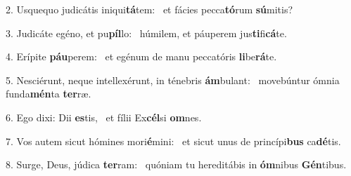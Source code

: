 2. Usquequo judicátis iniqui\textbf{tá}tem: \ast\  et fácies pecca\textbf{tó}rum \textbf{sú}mitis?\

3. Judicáte egéno, et pu\textbf{píl}lo: \ast\  húmilem, et páuperem jus\textbf{ti}fi\textbf{cá}te.\

4. Erípite \textbf{páu}perem: \ast\  et egénum de manu peccatóris \textbf{li}be\textbf{rá}te.\

5. Nesciérunt, neque intellexérunt, in ténebris \textbf{ám}bulant: \ast\  movebúntur ómnia funda\textbf{mén}ta \textbf{ter}ræ.\

6. Ego dixi: Dii \textbf{es}tis, \ast\  et fílii Ex\textbf{cél}si \textbf{om}nes.\

7. Vos autem sicut hómines mori\textbf{é}mini: \ast\  et sicut unus de princípi\textbf{bus} ca\textbf{dé}tis.\

8. Surge, Deus, júdica \textbf{ter}ram: \ast\  quóniam tu hereditábis in \textbf{óm}nibus \textbf{Gén}tibus.\

